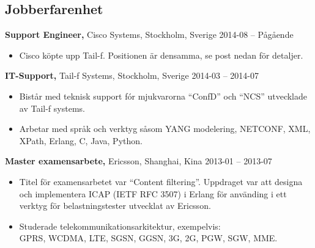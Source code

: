 \documentclass[margin]{res}
\begin{document}

\address{{\bf Kontaktinformation}\\

linkedin.com/in/tommymattsson\\
github.com/Taddic\\
}

\address{{\bf Adress}\\
  \\
}

\begin{resume}

\section{Jobberfarenhet}
{\bf Support Engineer,} Cisco Systems, Stockholm, Sverige \hfill 2014-08 -- Pågående
 \begin{itemize} \itemsep -2pt  %
 \item Cisco köpte upp Tail-f. Positionen är densamma, se post nedan
   för detaljer.
 \end{itemize}

{\bf IT-Support,} Tail-f Systems, Stockholm, Sverige \hfill 2014-03 -- 2014-07
 \begin{itemize} \itemsep -2pt  %
 \item Bistår med teknisk support fór mjukvarorna ``ConfD'' och ``NCS''
   utvecklade av Tail-f systems.
 \item Arbetar med språk och verktyg såsom YANG modelering, NETCONF,
   XML, XPath, Erlang, C, Java, Python.
 \end{itemize}

{\bf Master examensarbete,} Ericsson, Shanghai, Kina \hfill 2013-01 -- 2013-07
 \begin{itemize} \itemsep -2pt  %
 \item Titel för examensarbetet var ``Content filtering''. Uppdraget var
   att designa och implementera ICAP (IETF RFC 3507) i Erlang för
   använding i ett verktyg för belastningstester utvecklat av Ericsson.
 \item Studerade telekommunikationsarkitektur, exempelvis: \\
 GPRS, WCDMA, LTE, SGSN, GGSN, 3G, 2G, PGW, SGW, MME.
 \end{itemize}


\end{resume}
\end{document}

